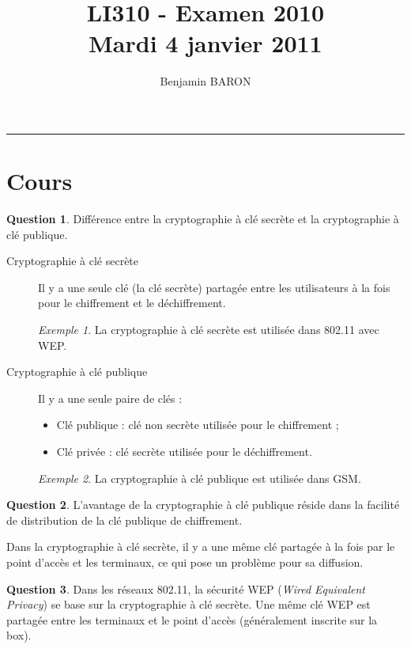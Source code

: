 \documentclass[11pt,english,french]{scrreprt}
\makeatletter
\theoremstyle{remark}
\newtheorem*{ex*}{Exemple}
\theoremstyle{definition}
\newtheorem{ques}{Question}[section]
\renewcommand{\maketitle}{\begingroup%
    \let\footnotesize\small
    \let\footnoterule\relax
    \parindent \z@
    \reset@font
    \begin{flushleft}
      \huge \sffamily \bfseries\color{orange} \@title
    \end{flushleft}
    \hrule height 1pt
    \begin{flushright}
      \large\sffamily\color{MyDarkBlue}\@author
    \end{flushright}
  \endgroup%
  \setcounter{footnote}{0}%
}
\makeatother
\begin{document}
	
\title{LI310 - Examen 2010\\
Mardi 4 janvier 2011}
\author{Benjamin BARON}

\maketitle

\section{Cours} %

\begin{ques}
	Différence entre la cryptographie à clé secrète et la cryptographie à clé publique.
\begin{description}	
	\item [Cryptographie à clé secrète]
	Il y a une seule clé (la clé secrète) partagée entre les utilisateurs à la fois pour le chiffrement et le déchiffrement.
	\begin{ex*}
		La cryptographie à clé secrète est utilisée dans 802.11 avec WEP.
	\end{ex*}
	\item [Cryptographie à clé publique]
	Il y a une seule paire de clés :\begin{itemize}
		\item Clé publique : clé non secrète utilisée pour le chiffrement ;
		\item Clé privée : clé secrète utilisée pour le déchiffrement.
	\end{itemize}
	\begin{ex*}
		La cryptographie à clé publique est utilisée dans GSM.
	\end{ex*}
\end{description}
\end{ques}

\begin{ques}
	L'avantage de la cryptographie à clé publique réside dans la facilité de distribution de la clé publique de chiffrement.
	
	Dans la cryptographie à clé secrète, il y a une même clé partagée à la fois par le point d'accès et les terminaux, ce qui pose un problème pour sa diffusion.
\end{ques}

\begin{ques}
	Dans les réseaux 802.11, la sécurité WEP (\emph{Wired Equivalent Privacy}) se base sur la cryptographie à clé secrète. Une même clé WEP est partagée entre les terminaux et le point d'accès (généralement inscrite sur la box).
\end{ques}
\end{document}
